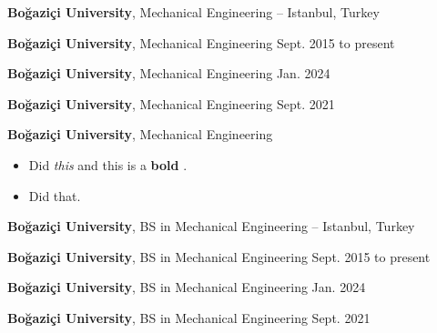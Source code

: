 \documentclass[10pt, letterpaper]{article}
\newenvironment{highlights}{
        \begin{itemize}[
                topsep=0pt,
                partopsep=0pt,
                itemsep=0pt,
                leftmargin=10pt
            ]
    }{
        \end{itemize}
    } %
\let\hrefWithoutArrow\href
\renewcommand{\href}[2]{\hrefWithoutArrow{#1}{\mbox{\ifthenelse{\equal{#2}{}}{ }{#2 }\raisebox{.15ex}{\footnotesize \faExternalLink*}}}}
\begin{document}
        \textbf{Boğaziçi University}, Mechanical Engineering -- Istanbul, Turkey \hfill 



        \vspace{8pt}

        \textbf{Boğaziçi University}, Mechanical Engineering \hfill Sept. 2015 to present



        \vspace{8pt}

        \textbf{Boğaziçi University}, Mechanical Engineering \hfill Jan. 2024



        \vspace{8pt}

        \textbf{Boğaziçi University}, Mechanical Engineering \hfill Sept. 2021



        \vspace{8pt}

        \textbf{Boğaziçi University}, Mechanical Engineering \hfill 

        \begin{highlights}
        \item Did \textit{this} and this is a \textbf{bold} \href{https://example.com}{link}.
        \item Did that.
        \end{highlights}


        \vspace{8pt}

        \textbf{Boğaziçi University}, BS in Mechanical Engineering -- Istanbul, Turkey \hfill 



        \vspace{8pt}

        \textbf{Boğaziçi University}, BS in Mechanical Engineering \hfill Sept. 2015 to present



        \vspace{8pt}

        \textbf{Boğaziçi University}, BS in Mechanical Engineering \hfill Jan. 2024



        \vspace{8pt}

        \textbf{Boğaziçi University}, BS in Mechanical Engineering \hfill Sept. 2021
\end{document}
